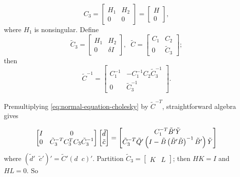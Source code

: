 \begin{equation*}
C_3 = \begin{bmatrix} H_1 & H_2 \\ 0 & 0 \end{bmatrix} = \begin{bmatrix} H \\  0 \end{bmatrix},
\end{equation*}
\noindent
where $H_1$ is nonsingular. Define
\begin{equation} \label{eq:cholesky-factor-mod}
\tilde{C}_3 = \begin{bmatrix}
H_1 & H_2 \\
0  & \delta I 
\end{bmatrix}, \;\;
\tilde{C} = \begin{bmatrix}
C_1 & C_2 \\
0  & \tilde{C}_3 
\end{bmatrix};
\end{equation}
\noindent
then
\begin{equation} \label{eq:cholesky-factor-mod-inverse}
\tilde{C}^{-1} = \begin{bmatrix}
C_1^{-1} & -C_1^{-1} C_2 \tilde{C}_3^{-1} \\
0  & \tilde{C}_3^{-1}
\end{bmatrix}.
\end{equation}

Premultiplying \ref{eq:normal-equation-cholesky} by $\tilde{C}^{-T}$, straightforward algebra gives 

\begin{equation} \label{eq:vectorized-normal-equations-cholesky}
\begin{bmatrix}
I & 0 \\
0 & \tilde{C}_3^{-T} C_3^{T} C_3 \tilde{C}_3^{-1}\\
\end{bmatrix}
\begin{bmatrix}
\tilde{d}\\
\tilde{c}\\
\end{bmatrix}
= \begin{bmatrix}
C_1^{-T} \tilde{B}'\tilde{Y} \\
\tilde{C}_3^{-T} \tilde{Q}'\left( I - \tilde{B}\left( \tilde{B}' \tilde{B} \right)^{-1} \tilde{B}' \right) \tilde{Y}\\
\end{bmatrix}
\end{equation}
\noindent
where $\left( \tilde{d}'\;\;\tilde{c}' \right)' =  \tilde{C}' \left( d\;\;c \right)'$. Partition $\tilde{C}_3 = \begin{bmatrix} K &  L\end{bmatrix}$; then $HK = I$ and $HL = 0$. So

